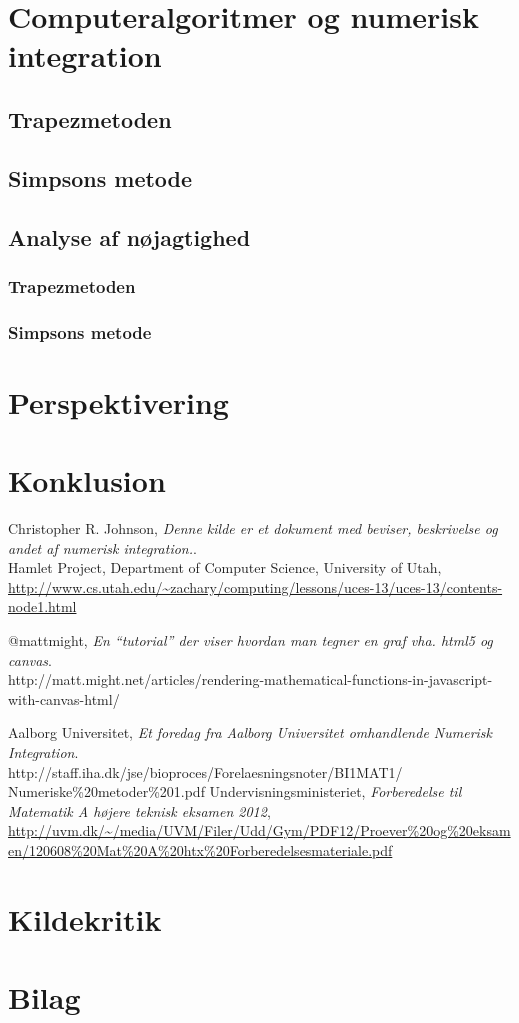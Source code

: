 \documentclass[12pt]{article}
\numberwithin{equation}{section}
\begin{document}
\section{Computeralgoritmer og numerisk integration}
\subsection{Trapezmetoden}
\subsection{Simpsons metode}
\subsection{Analyse af nøjagtighed}
\subsubsection{Trapezmetoden}
\subsubsection{Simpsons metode}

\section{Perspektivering}
\section{Konklusion}

\clearpage
{}
\begin{thebibliography}{9}

  	Christopher R. Johnson,
  	\emph{Denne kilde er et dokument med beviser, beskrivelse og andet af numerisk integration.}.\\
  	Hamlet Project, 
  	Department of Computer Science,
	University of Utah,
	\url{http://www.cs.utah.edu/~zachary/computing/lessons/uces-13/uces-13/contents-node1.html}
	
	@mattmight,
	\emph{En ``tutorial'' der viser hvordan man tegner en graf vha. html5 og canvas}.\\
	http://matt.might.net/articles/rendering-mathematical-functions-in-javascript-with-canvas-html/

	Aalborg Universitet,
	\emph{Et foredag fra Aalborg Universitet omhandlende Numerisk Integration}.\\
	http://staff.iha.dk/jse/bioproces/Forelaesningsnoter/BI1MAT1/\\Numeriske\%20metoder\%201.pdf
	Undervisningsministeriet,
	\emph{Forberedelse til Matematik A højere teknisk eksamen 2012},
	\url{http://uvm.dk/~/media/UVM/Filer/Udd/Gym/PDF12/Proever\%20og\%20eksamen/120608\%20Mat\%20A\%20htx\%20Forberedelsesmateriale.pdf}

\end{thebibliography}

\section{Kildekritik}
\section{Bilag}
\end{document}
